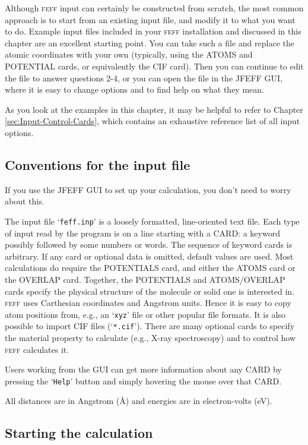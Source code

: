 \documentclass[11pt,oneside]{report} %
\newcommand{\program}[1]{\textsc{#1}}
\newcommand{\feff}{\program{feff}}
\newcommand{\file}[1]{`\texttt{#1}'}
\begin{document}
Although {\feff} input can certainly be constructed from scratch, the most common approach is to start from an existing input file, and modify it to what you want to do.  Example input files included in your {\feff} installation and discussed in this chapter are an excellent starting point.  You can take such a file and replace the atomic coordinates with your own (typically, using the ATOMS and POTENTIAL cards, or equivalently the CIF card).  Then you can continue to edit the file to answer questions 2-4, or you can open the file in the JFEFF GUI, where it is easy to change options and to find help on what they mean.

As you look at the examples in this chapter, it may be helpful to refer to Chapter \ref{sec:Input-Control-Cards}, which contains an exhaustive reference list of all input options.


\subsection{Conventions for the input file}

If you use the JFEFF GUI to set up your calculation, you don't need to worry about this.

The input file \file{feff.inp} is a loosely formatted, line-oriented text file. Each type of input read by the program is on a line 
starting with a CARD:  a keyword possibly followed by some numbers or words.  The sequence of keyword cards is arbitrary. If any card or optional data is omitted,
default values are used.  Most calculations do require the POTENTIALS card, and either the ATOMS card or the OVERLAP card.  Together, the POTENTIALS and ATOMS/OVERLAP cards specify the physical structure of the
molecule or solid one is interested in.  {\feff} uses Carthesian coordinates and Angstrom units.  Hence it is easy to copy atom positions from, e.g., an \file{xyz} file or other popular file formats.  It is also possible to import CIF files (\file{*.cif}).  There are many optional cards to specify the material property to calculate (e.g., X-ray spectroscopy) and to control how {\feff} calculates it. 
 
Users working from the GUI can get more information about any CARD by pressing the \file{Help} button and simply hovering the mouse over that CARD.

All distances are in Angstrom ({\AA}) and energies are in electron-volts (eV). 


\subsection{Starting the calculation}
\end{document}
